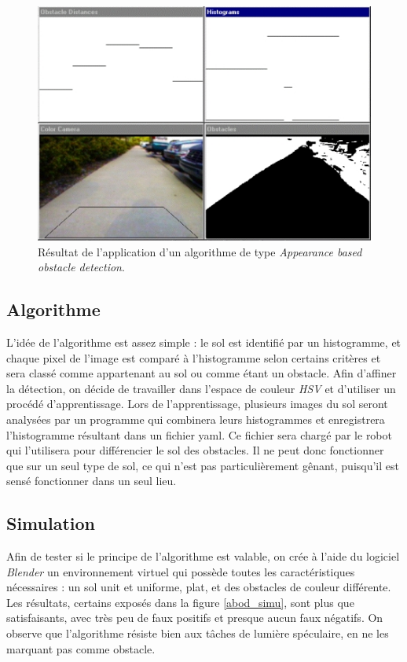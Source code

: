 \begin{figure}
    \begin{center}
        \includegraphics[width=0.8\linewidth]{rcs/abod.png}
    \end{center}
    \caption{Résultat de l'application d'un algorithme de type \emph{Appearance based obstacle detection}.}
    \label{abod}
\end{figure}

\subsection{Algorithme} L'idée de l'algorithme est assez simple : le sol est identifié par un histogramme, et chaque pixel de l'image est comparé à l'histogramme selon certains critères et sera classé comme appartenant au sol ou comme étant un obstacle. Afin d'affiner la détection, on décide de travailler dans l'espace de couleur \emph{HSV} et d'utiliser un procédé d'apprentissage. Lors de l'apprentissage, plusieurs images du sol seront analysées par un programme qui combinera leurs histogrammes et enregistrera l'histogramme résultant dans un fichier yaml. Ce fichier sera chargé par le robot qui l'utilisera pour différencier le sol des obstacles. Il ne peut donc fonctionner que sur un seul type de sol, ce qui n'est pas particulièrement gênant, puisqu'il est sensé fonctionner dans un seul lieu.

\subsection{Simulation} Afin de tester si le principe de l'algorithme est valable, on crée à l'aide du logiciel \emph{Blender} un environnement virtuel qui possède toutes les caractéristiques nécessaires : un sol unit et uniforme, plat, et des obstacles de couleur différente. Les résultats, certains exposés dans la figure \ref{abod_simu}, sont plus que satisfaisants, avec très peu de faux positifs et presque aucun faux négatifs. On observe que l'algorithme résiste bien aux tâches de lumière spéculaire, en ne les marquant pas comme obstacle.

